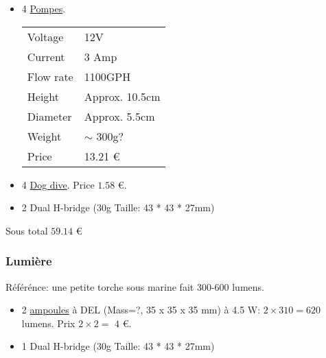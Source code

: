 \documentclass[11pt,a4paper]{article}
\newcommand{\PAYE}{{\Large\color{orange}\checkmark}}
\newcommand{\RECU}{{\Large\color{green}\checkmark}}
\begin{document}
        \begin{itemize}
          \item 4 \href{http://www.aliexpress.com/item/1100GPH-High-Flow-Submersible-Marine-Boat-Electric-Bilge-Pump-12V-3A-FREE-SHIPPING-DHL-EMS-gib/32302138453.html}{Pompes}. \PAYE\\
                    \begin{tabular}{ll}
                      Voltage & 12V \\
                      Current & 3 Amp \\
                      Flow rate & 1100GPH \\
                      Height & Approx. 10.5cm\\
                      Diameter & Approx. 5.5cm\\
                      Weight & $\sim$ 300g? \\
                      Price & {\color{red}13.21 €}
                    \end{tabular}
          
          \item 4 \href{http://hobbyking.com/hobbyking/store/__12716__5mm_Drive_dog.html}{Dog dive}. Price {\color{red} $1.58$} €.
          
          \item 2 Dual H-bridge (30g Taille: 43 * 43 * 27mm) \PAYE \RECU
          
        \end{itemize}
        Sous total {\color{red}$59.14$ €} 

        

        
        
      \subsubsection{Lumière \PAYE}
        Référénce: une petite torche sous marine fait 300-600 lumens. 
        \begin{itemize}
          \item 2 \href{http://www.miniinthebox.com/fr/mr11-4-5w-15x5730smd-310-320lm-2800-3000k-chaud-ampoule-led-a-lumiere-blanche-spot-12-24v_p960936.html?pos=ultimately_buy_6}{ampoules} à DEL (Mass=?, 35 x 35 x 35 mm) à 4.5 W: $2\times 310 = 620$ lumens. Prix $2\times 2 =$ {\color{red}$4$ €}.
          \item 1 Dual H-bridge (30g Taille: 43 * 43 * 27mm) \PAYE \RECU
        \end{itemize}
\end{document}
